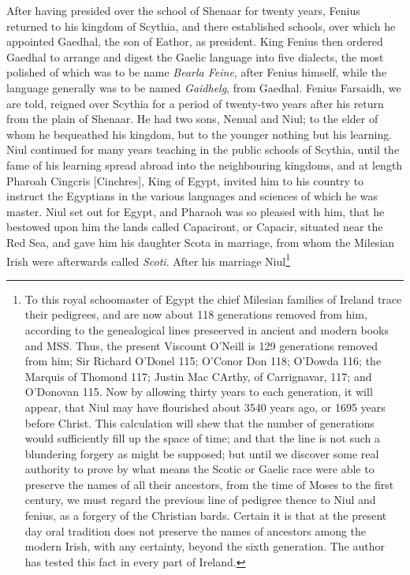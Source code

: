 \documentclass[11pt,oneside]{memoir}
\begin{document}
After having presided over the school of Shenaar for twenty years, Fenius returned to his kingdom of Scythia, and there established schools, over which he appointed Gaedhal, the son of Eathor, as president.
King Fenius then ordered Gaedhal to arrange and digest the Gaelic language into five dialects, the most polished of which was to be name \textit{Bearla Feine}, after Fenius himself, while the language generally was to be named \textit{Gaidhelg}, from Gaedhal.
Fenius Farsaidh, we are told, reigned over Scythia for a period of twenty-two years after his return from the plain of Shenaar.
He had two sons, Nenual and Niul;
to the elder of whom he bequeathed his kingdom, but to the younger nothing but his learning.
Niul continued for many years teaching in the public schools of Scythia, until the fame of his learning spread abroad into the neighbouring kingdoms, and at length Pharoah Cingcris [Cinchres], King of Egypt, invited him to his country to instruct the Egyptians in the various languages and sciences of which he was master.
Niul set out for Egypt, and Pharaoh was so pleased with him, that he bestowed upon him the lands called Capaciront, or Capacir, situated near the Red Sea, and gave him his daughter Scota in marriage, from whom the Milesian Irish were afterwards called \textit{Scoti}.
After his marriage Niul\footnote{
    To this royal schoomaster of Egypt the chief Milesian families of Ireland trace their pedigrees, and are now about 118 generations removed from him, according to the genealogical lines preseerved in ancient and modern books and MSS.
    Thus, the present Viscount O'Neill is 129 generations removed from him;
    Sir Richard O'Donel 115;
    O'Conor Don 118;
    O'Dowda 116;
    the Marquis of Thomond 117;
    Justin Mac CArthy, of Carrignavar, 117;
    and O'Donovan 115.
    Now by allowing thirty years to each generation, it will appear, that Niul may have flourished about 3540 years ago, or 1695 years before Christ.
    This calculation will shew that the number of generations would sufficiently fill up the space of time;
    and that the line is not such a blundering forgery as might be supposed;
    but until we discover some real authority to prove by what means the Scotic or Gaelic race were able to preserve the names of all their ancestors, from the time of Moses to the first century, we must regard the previous line of pedigree thence to Niul and fenius, as a forgery of the Christian bards.
    Certain it is that at the present day oral tradition does not preserve the names of ancestors among the modern Irish, with any certainty, beyond the sixth generation.
    The author has tested this fact in every part of Ireland.
}
\end{document}
